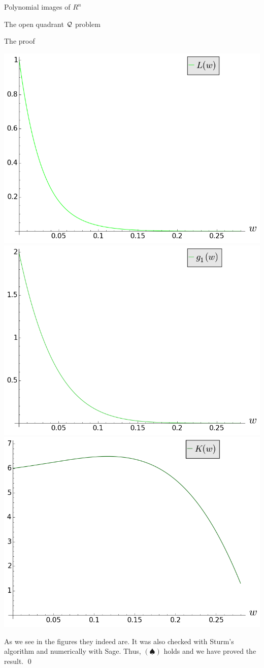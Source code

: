 \documentclass[11pt, a4paper, english, twoside, notitlepage]{report}
\begin{document}
\begin{chapter}{Polynomial images of $R^n$}
\begin{section}{The open quadrant $\mathcal{Q}$ problem}
\begin{subsection}{The proof}
\begin{Proof}
			\hspace{-3cm}
			\includegraphics[width=0.5\linewidth]{plots/ch1_16_L.png}
			\includegraphics[width=0.5\linewidth]{plots/ch1_17_g_1.png}
			\includegraphics[width=0.5\linewidth]{plots/ch1_18_K.png}
			\vspace{0.5cm}			
			
			As we see in the figures they indeed are. It was also checked with Sturm's algorithm and numerically with Sage. Thus, $(\spadesuit)$ holds and we have proved the result. \qed


		\end{Proof}
		
	\end{subsection}
	
\end{section}


\end{chapter}
\end{document}
